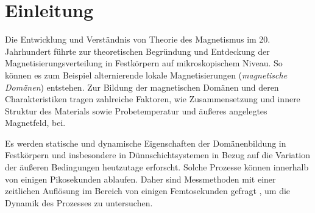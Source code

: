 \chapter{Einleitung}
\label{text:einleitung}


Die Entwicklung und Verständnis von Theorie des Magnetismus im 20. Jahrhundert führte zur theoretischen Begründung und Entdeckung der Magnetisierungsverteilung in Festkörpern auf mikroskopischem Niveau. So können es zum Beispiel alternierende lokale Magnetisierungen (\emph{magnetische Domänen}) entstehen. Zur Bildung der magnetischen Domänen und deren Charakteristiken tragen zahlreiche Faktoren, wie Zusammensetzung und innere Struktur des Materials sowie Probetemperatur und äußeres angelegtes Magnetfeld, bei.

\noindent
Es werden statische und dynamische Eigenschaften der Domänenbildung in Festkörpern und insbesondere in Dünnschichtsystemen in Bezug auf die Variation der äußeren Bedingungen heutzutage erforscht. Solche Prozesse können innerhalb von einigen Pikosekunden ablaufen. Daher sind Messmethoden mit einer zeitlichen Auflösung im Bereich von einigen Femtosekunden gefragt \cite{pfau_ultrafast_2012}, um die Dynamik des Prozesses zu untersuchen.

